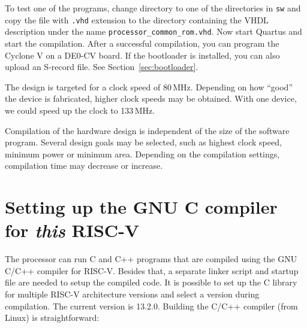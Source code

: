 \documentclass[12pt]{article}
\begin{document}
To test one of the programs, change directory to one of the directories in \lstinline|sw| and copy the file with \lstinline|.vhd| extension to the directory containing the VHDL description under the name \lstinline|processor_common_rom.vhd|.
Now start Quartus and start the compilation. After a successful compilation, you can program the Cyclone V on a DE0-CV board. If the bootloader is installed, you can also upload an S-record file. See Section~\ref{sec:bootloader}.

The design is targeted for a clock speed of 80\,MHz. Depending on how ``good'' the device is fabricated, higher clock speeds may be obtained. With one device, we could speed up the clock to 133\,MHz.

Compilation of the hardware design is independent of the size of the software program. Several design goals may be selected, such as highest clock speed, minimum power or minimum area. Depending on the compilation settings, compilation time may decrease or increase.


\section{Setting up the GNU C compiler for \textit{this} RISC-V}
\label{sec:ccompiler}
The processor can run C and C++ programs that are compiled using the GNU C/C++ compiler for RISC-V. Besides that, a separate linker script and startup file are needed to setup the compiled code. It is possible to set up the C library for multiple RISC-V architecture versions and select a version during compilation. The current version is 13.2.0. Building the C/C++ compiler (from Linux) is straightforward:
\end{document}

